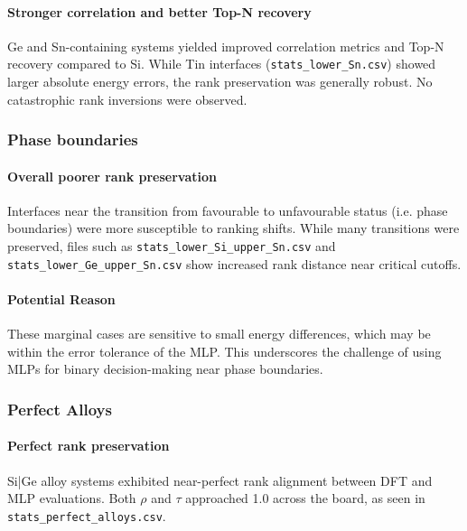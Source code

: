 \paragraph{Stronger correlation and better Top-N recovery}

Ge and Sn-containing systems yielded improved correlation metrics and Top-N recovery compared to Si. While Tin
interfaces (\texttt{stats\_lower\_Sn.csv}) showed larger absolute energy errors, the rank preservation was generally
robust. No catastrophic rank inversions were observed.

\subsubsection{Phase boundaries}

\paragraph{Overall poorer rank preservation}

Interfaces near the transition from favourable to unfavourable status (i.e. phase boundaries) were more susceptible to
ranking shifts. While many transitions were preserved, files such as \texttt{stats\_lower\_Si\_upper\_Sn.csv} and
\texttt{stats\_lower\_Ge\_upper\_Sn.csv} show increased rank distance near critical cutoffs.

\paragraph{Potential Reason}

These marginal cases are sensitive to small energy differences, which may be within the error tolerance of the MLP.
This underscores the challenge of using MLPs for binary decision-making near phase boundaries.

\subsubsection{Perfect Alloys}

\paragraph{Perfect rank preservation}

Si|Ge alloy systems exhibited near-perfect rank alignment between DFT and MLP evaluations. Both $\rho$ and $\tau$ approached
1.0 across the board, as seen in \texttt{stats\_perfect\_alloys.csv}.

